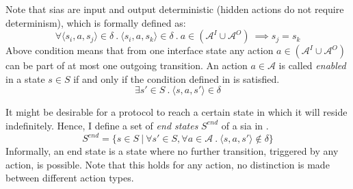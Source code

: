 
Note that \glspl{sia} are input and output deterministic (hidden actions do not require determinism), which is formally defined as:
\begin{displaymath}
    \forall \langle s_i, a, s_j \rangle \in \delta \ . \ \langle s_i, a, s_k \rangle \in \delta \ . \ a \in (\mathcal{A}^I \cup \mathcal{A}^O)\ \implies s_j = s_k
\end{displaymath}
Above condition means that from one interface state any action $a \in (\mathcal{A}^I \cup \mathcal{A}^O)$ can be part of at most one outgoing transition.
An action $a \in \mathcal{A}$ is called \emph{enabled} in a state $s \in S$ if and only if the condition defined in \Equ{\ref{eq_sia_enabled}} is satisfied.
\begin{equation}
    \label{eq_sia_enabled}
    \exists s' \in S \ . \ \langle s, a, s' \rangle \in \delta
\end{equation}

It might be desirable for a protocol to reach a certain state in which it will reside indefinitely.
Hence, I define a set of \emph{end states} $S^{end}$ of a \gls{sia} in \Equ{\ref{eq_sia_end}}.
\begin{equation}
    \label{eq_sia_end}
    S^{end} = \Big \{ s \in S \ | \ \forall s' \in S, \forall a \in \mathcal{A} \ . \ \langle s, a, s' \rangle \notin \delta \Big \}
\end{equation}
Informally, an end state is a state where no further transition, triggered by any action, is possible.
Note that this holds for any action, \ie no distinction is made between different action types.

